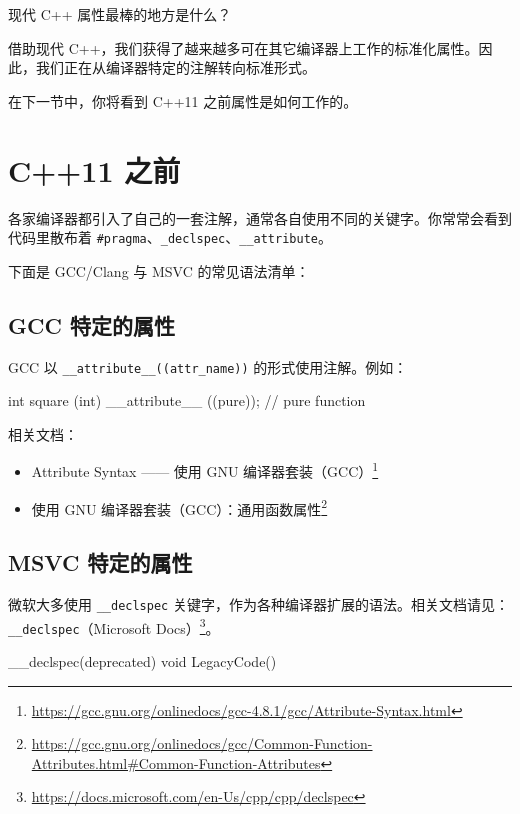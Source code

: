 现代 C++ 属性最棒的地方是什么？

借助现代 C++，我们获得了越来越多可在其它编译器上工作的标准化属性。因此，我们正在从编译器特定的注解转向标准形式。

在下一节中，你将看到 C++11 之前属性是如何工作的。

\section{C++11 之前}

各家编译器都引入了自己的一套注解，通常各自使用不同的关键字。你常常会看到代码里散布着 \texttt{\#pragma}、\texttt{\_declspec}、\texttt{\_\_attribute}。

下面是 GCC/Clang 与 MSVC 的常见语法清单：

\subsection{GCC 特定的属性}

GCC 以 \texttt{\_\_attribute\_\_((attr\_name))} 的形式使用注解。例如：

\begin{codebox}[cpp]
int square (int) __attribute__ ((pure)); // pure function
\end{codebox}

相关文档：

\begin{itemize}
\item Attribute Syntax —— 使用 GNU 编译器套装（GCC）\footnote{\url{https://gcc.gnu.org/onlinedocs/gcc-4.8.1/gcc/Attribute-Syntax.html}}
\item 使用 GNU 编译器套装（GCC）：通用函数属性\footnote{\url{https://gcc.gnu.org/onlinedocs/gcc/Common-Function-Attributes.html\#Common-Function-Attributes}}
\end{itemize}

\subsection{MSVC 特定的属性}

微软大多使用 \texttt{\_\_declspec} 关键字，作为各种编译器扩展的语法。相关文档请见：\texttt{\_\_declspec}（Microsoft Docs）\footnote{\url{https://docs.microsoft.com/en-Us/cpp/cpp/declspec}}。

\begin{codebox}[cpp]
__declspec(deprecated) void LegacyCode() { }
\end{codebox}

